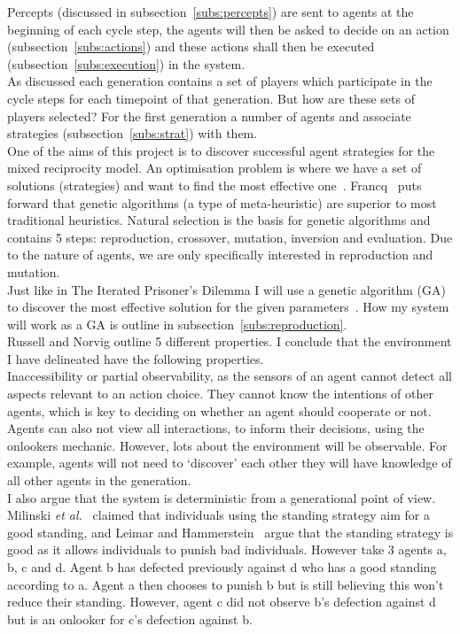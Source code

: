 \documentclass[]{final_report}
\begin{document}
Percepts (discussed in subsection~\ref{subs:percepts}) are sent to agents at the beginning of each cycle step, the agents will then be asked to decide on an action (subsection~\ref{subs:actions}) and these actions shall then be executed (subsection~\ref{subs:execution}) in the system.\\
As discussed each generation contains a set of players which participate in the cycle steps for each timepoint of that generation. But how are these sets of players selected? For the first generation a number of agents and associate strategies (subsection~\ref{subs:strat}) with them.\\
One of the aims of this project is to discover successful agent strategies for the mixed reciprocity model. An optimisation problem is where we have a set of solutions (strategies) and want to find the most effective one~\cite{optimisation_problems}. Francq~\cite{optimisation_problems} puts forward that genetic algorithms (a type of meta-heuristic) are superior to most traditional heuristics. Natural selection is the basis for genetic algorithms and contains 5 steps: reproduction, crossover, mutation, inversion and evaluation. Due to the nature of agents, we are only specifically interested in reproduction and mutation.\\ 
Just like in The Iterated Prisoner's Dilemma I will use a genetic algorithm (GA) to discover the most effective solution for the given parameters~\cite{mitchell1998introduction}. How my system will work as a GA is outline in subsection~\ref{subs:reproduction}.\\
Russell and Norvig outline 5 different properties. I conclude that the environment I have delineated have the following properties.\\
Inaccessibility or partial observability, as the sensors of an agent cannot detect all aspects relevant to an action choice. They cannot know the intentions of other agents, which is key to deciding on whether an agent should cooperate or not. Agents can also not view all interactions, to inform their decisions, using the onlookers mechanic. However, lots about the environment will be observable. For example, agents will not need to `discover' each other they will have knowledge of all other agents in the generation.\\
I also argue that the system is deterministic from a generational point of view. Milinski \textit{et al.}~\cite{imagevsstanding} claimed that individuals using the standing strategy aim for a good standing, and Leimar and Hammerstein~\cite{leimarhammer} argue that the standing strategy is good as it allows individuals to punish bad individuals. However take 3 agents a, b, c and d. Agent b has defected previously against d who has a good standing according to a. Agent a then chooses to punish b but is still believing this won't reduce their standing. However, agent c did not observe b's defection against d but is an onlooker for c's defection against b.\\
\end{document}
